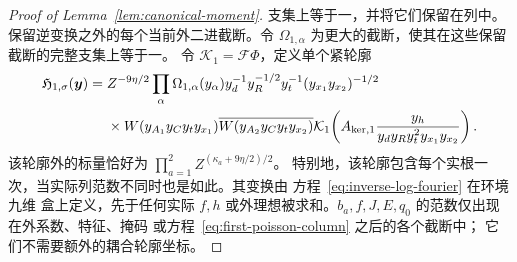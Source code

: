 \documentclass[11pt,a4paper]{article}
\numberwithin{equation}{section}
\numberwithin{figure}{section}
\theoremstyle{definition}
\theoremstyle{remark}
\begin{document}
\begin{proof}[Proof of Lemma~\ref{lem:canonical-moment}]
支集上等于一，并将它们保留在列中。保留逆变换之外的每个当前外二进截断。令 \(\Omega_{1,\alpha}\) 为更大的截断，使其在这些保留截断的完整支集上等于一。
令 \(\mathcal K_1=\mathcal F\Phi\)，定义单个紧轮廓
\begin{equation}\label{eq:inverse-first-profile}
 \begin{split}
 \mathfrak H_{1,\sigma}(\boldsymbol y)={}&Z^{-9\eta/2}
 \prod_\alpha\Omega_{1,\alpha}(y_\alpha)
 y_d^{-1}y_R^{-1/2}y_t^{-1}(y_{x_1}y_{x_2})^{-1/2}\\
 &\times W(y_{A_1}y_Cy_ty_{x_1})
       \overline{W(y_{A_2}y_Cy_ty_{x_2})}
 \mathcal K_1\!\left(A_{{\rm ker},1}
       \frac{y_h}{y_dy_Ry_t^2y_{x_1}y_{x_2}}\right).
 \end{split}
\end{equation}
该轮廓外的标量恰好为
\(\prod_{a=1}^2Z^{(\kappa_a+9\eta/2)/2}\)。
特别地，该轮廓包含每个实根一次，当实际列范数不同时也是如此。其变换由
方程~\eqref{eq:inverse-log-fourier} 在环境九维
盒上定义，先于任何实际 \(f,h\) 或外理想被求和。\(b_a,f,J,E,q_0\) 的范数仅出现在外系数、特征、掩码
或方程~\eqref{eq:first-poisson-column} 之后的各个截断中；
它们不需要额外的耦合轮廓坐标。


\end{proof}
\end{document}
